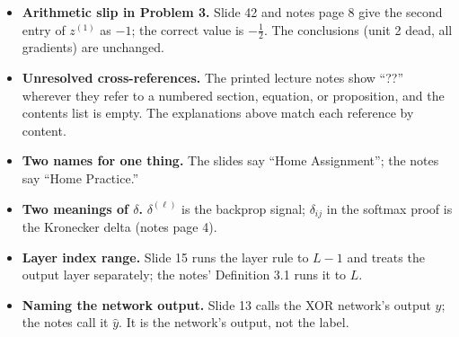 \begin{itemize}
\item \textbf{Arithmetic slip in Problem 3.} Slide 42 and notes page 8 give the second entry of $z^{(1)}$ as $-1$; the correct value is $-\tfrac12$. The conclusions (unit 2 dead, all gradients) are unchanged.
\item \textbf{Unresolved cross-references.} The printed lecture notes show ``??'' wherever they refer to a numbered section, equation, or proposition, and the contents list is empty. The explanations above match each reference by content.
\item \textbf{Two names for one thing.} The slides say ``Home Assignment''; the notes say ``Home Practice.''
\item \textbf{Two meanings of $\delta$.} $\delta^{(\ell)}$ is the backprop signal; $\delta_{ij}$ in the softmax proof is the Kronecker delta (notes page 4).
\item \textbf{Layer index range.} Slide 15 runs the layer rule to $L-1$ and treats the output layer separately; the notes' Definition 3.1 runs it to $L$.
\item \textbf{Naming the network output.} Slide 13 calls the XOR network's output $y$; the notes call it $\hat{y}$. It is the network's output, not the label.
\end{itemize}

